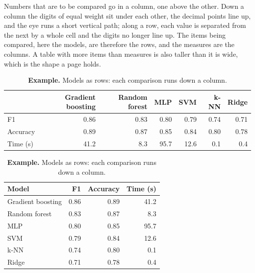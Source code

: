 Numbers that are to be compared go in a column, one above the other. Down a column the digits of equal weight sit under each other, the decimal points line up, and the eye runs a short vertical path; along a row, each value is separated from the next by a whole cell and the digits no longer line up. The items being compared, here the models, are therefore the rows, and the measures are the columns. A table with more items than measures is also taller than it is wide, which is the shape a page holds.

\begin{table}[ht]
	\centering
	\caption{The six models on three measures. Transposed, each measure is one column of like numbers.}
	\label{tab-table-transpose}
	\begin{subtable}[t]{\textwidth}
		\centering
		\caption{\textbf{Counterexample.} Models as columns: every comparison between models runs along a row.}
		\small
		\begin{tabular}{lrrrrrr}
			\toprule
			& Gradient boosting & Random forest & MLP & SVM & k-NN & Ridge \\
			\midrule
			F1 & 0.86 & 0.83 & 0.80 & 0.79 & 0.74 & 0.71 \\
			Accuracy & 0.89 & 0.87 & 0.85 & 0.84 & 0.80 & 0.78 \\
			Time (s) & 41.2 & 8.3 & 95.7 & 12.6 & 0.1 & 0.4 \\
			\bottomrule
		\end{tabular}
	\end{subtable}

	\vspace{1em}
	\begin{subtable}[t]{\textwidth}
		\centering
		\caption{\textbf{Example.} Models as rows: each comparison runs down a column.}
		\small
		\begin{tabular}{lrrr}
			\toprule
			Model & F1 & Accuracy & Time (s) \\
			\midrule
			Gradient boosting & 0.86 & 0.89 & 41.2 \\
			Random forest & 0.83 & 0.87 & 8.3 \\
			MLP & 0.80 & 0.85 & 95.7 \\
			SVM & 0.79 & 0.84 & 12.6 \\
			k-NN & 0.74 & 0.80 & 0.1 \\
			Ridge & 0.71 & 0.78 & 0.4 \\
			\bottomrule
		\end{tabular}
	\end{subtable}
\end{table}

